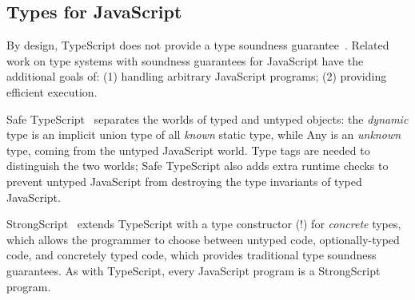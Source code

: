 








\subsection{Types for JavaScript}

By design, TypeScript does not provide a type soundness guarantee~\cite{BiermanAT14}.
Related work on type systems with soundness guarantees for JavaScript 
have the additional goals of: (1) handling arbitrary JavaScript programs;
(2) providing efficient execution.

Safe TypeScript~\cite{SafeTypeScript15} separates the worlds of typed and untyped
objects: the \emph{dynamic} type is an implicit union type of all \emph{known} static type,
while Any is an \emph{unknown} type, coming from the untyped JavaScript world. Type tags
are needed to distinguish the two worlds; Safe TypeScript also adds extra runtime checks
to prevent untyped JavaScript from destroying the type invariants of typed JavaScript.

StrongScript~\cite{StrongScriptECOOP15} extends TypeScript with a type constructor (!)
for \emph{concrete} types, which allows the programmer to choose between untyped
code, optionally-typed code, and concretely typed code, which provides traditional
type soundness guarantees. As with TypeScript, every JavaScript program is a StrongScript program.

